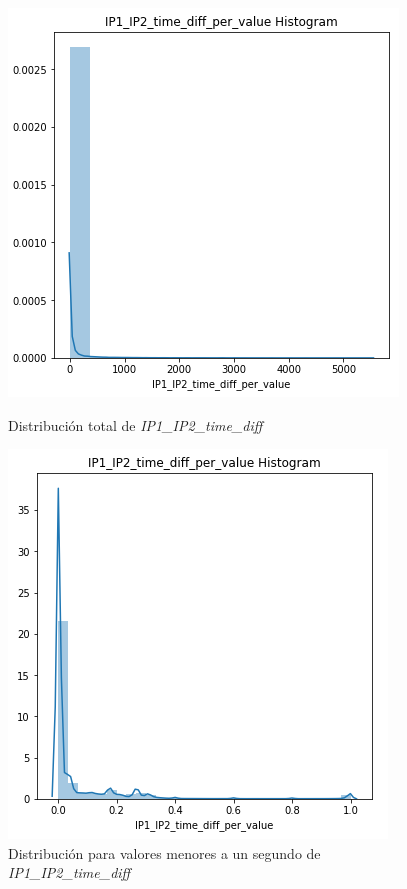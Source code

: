 \begin{figure}[H]
   \begin{minipage}{0.48\textwidth}
     \centering
     \includegraphics[width=0.8\linewidth]{figs/ip12diff_1.PNG}
     \caption{Distribución total de \textit{IP1\_IP2\_time\_diff}}
     \label{Fig:ip12_diff1}
   \end{minipage}\hfill
   \begin{minipage}{0.48\textwidth}
     \centering
     \includegraphics[width=0.8\linewidth]{figs/ip12diff_2.PNG}
     \caption{Distribución para valores menores a un segundo de \textit{IP1\_IP2\_time\_diff} }
     \label{Fig:ip12_diff2}
   \end{minipage}
\end{figure}

